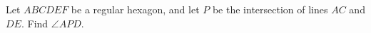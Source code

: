 Let $ABCDEF$ be a regular hexagon, and let $P$ be the intersection of lines $AC$ and $DE$. Find $\angle APD$.
